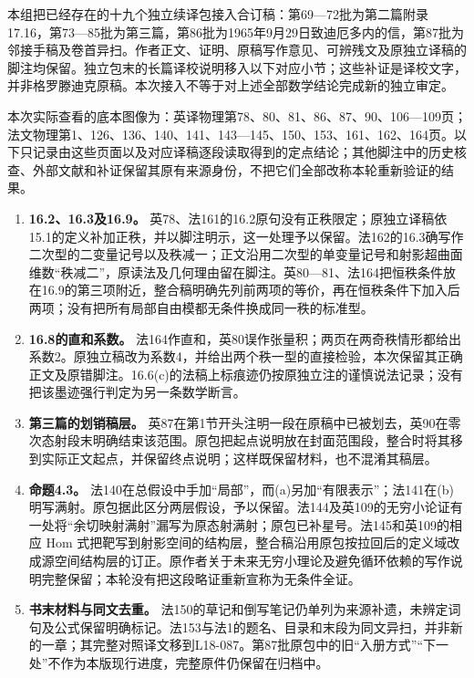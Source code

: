 本组把已经存在的十九个独立续译包接入合订稿：第69—72批为第二篇附录17.16，第73—85批为第三篇，第86批为1965年9月29日致迪厄多内的信，第87批为邻接手稿及卷首异扫。作者正文、证明、原稿写作意见、可辨残文及原独立译稿的脚注均保留。独立包末的长篇译校说明移入以下对应小节；这些补证是译校文字，并非格罗滕迪克原稿。本次接入不等于对上述全部数学结论完成新的独立审定。

本次实际查看的底本图像为：英译物理第78、80、81、86、87、90、106—109页；法文物理第1、126、136、140、141、143—145、150、153、161、162、164页。以下只记录由这些页面以及对应译稿逐段读取得到的定点结论；其他脚注中的历史核查、外部文献和补证保留其原有来源身份，不把它们全部改称本轮重新验证的结果。

\begin{enumerate}[label=\arabic*.]
\item \textbf{16.2、16.3及16.9。} 英78、法161的16.2原句没有正秩限定；原独立译稿依15.1的定义补加正秩，并以脚注明示，这一处理予以保留。法162的16.3确写作二次型的二变量记号以及秩减一；正文沿用二次型的单变量记号和射影超曲面维数“秩减二”，原读法及几何理由留在脚注。英80—81、法164把恒秩条件放在16.9的第三项附近，整合稿明确先列前两项的等价，再在恒秩条件下加入后两项；没有把所有局部自由模都无条件换成同一秩的标准型。
\item \textbf{16.8的直和系数。} 法164作直和，英80误作张量积；两页在两奇秩情形都给出系数2。原独立稿改为系数4，并给出两个秩一型的直接检验，本次保留其正确正文及原错脚注。16.6(c)的法稿上标痕迹仍按原独立注的谨慎说法记录；没有把该墨迹强行判定为另一条数学断言。
\item \textbf{第三篇的划销稿层。} 英87在第1节开头注明一段在原稿中已被划去，英90在零次态射段末明确结束该范围。原包把起点说明放在封面范围段，整合时将其移到实际正文起点，并保留终点说明；这样既保留材料，也不混淆其稿层。
\item \textbf{命题4.3。} 法140在总假设中手加“局部”，而(a)另加“有限表示”；法141在(b)明写满射。原包据此区分两层假设，予以保留。法144及英109的无穷小论证有一处将“余切映射满射”漏写为原态射满射；原包已补星号。法145和英109的相应 Hom 式把靶写到射影空间的结构层，整合稿沿用原包按拉回后的定义域改成源空间结构层的订正。原作者关于未来无穷小理论及避免循环依赖的写作说明完整保留；本轮没有把这段略证重新宣称为无条件全证。
\item \textbf{书末材料与同文去重。} 法150的草记和倒写笔记仍单列为来源补遗，未辨定词句及公式保留明确标记。法153与法1的题名、目录和末段为同文异扫，并非新的一章；其完整对照译文移到L18-087。第87批原包中的旧“入册方式”“下一处”不作为本版现行进度，完整原件仍保留在归档中。
\end{enumerate}

